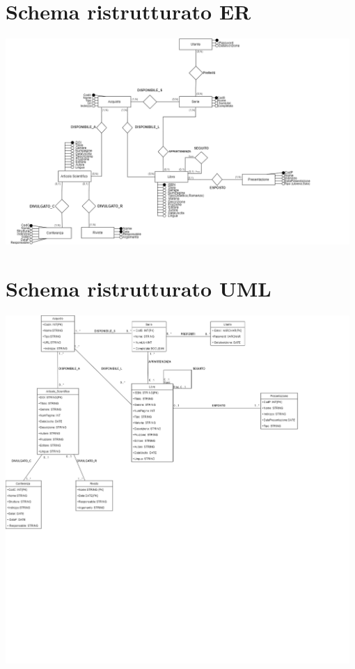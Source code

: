     \section{Schema ristrutturato ER}

      \begin{flushleft}
            \includegraphics[width=0.98\textwidth]{Immagini/DiagrammaErRistrutturato.png}
        \end{flushleft}
    
    \newpage

    \section{Schema ristrutturato UML}

          \begin{flushleft}
            \includegraphics[width=0.98\textwidth]{Immagini/DiagrammaUMLRistrutturato.png}
        \end{flushleft}

    